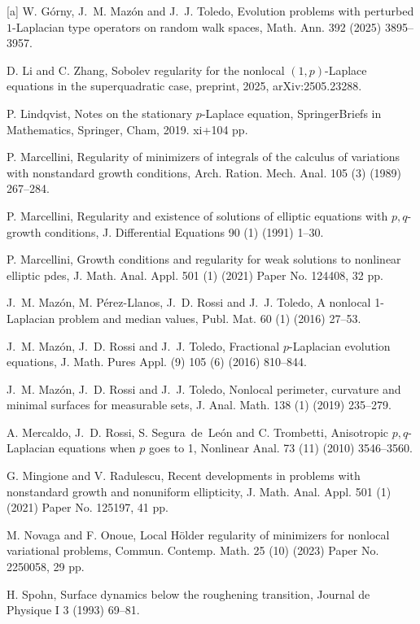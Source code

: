 \documentclass[reqno,10pt]{amsart}
\numberwithin{equation}{section}
\begin{document}
\begin{thebibliography}{[a]}
		 W. G\'{o}rny, J.~M. Maz\'on and J.~J. Toledo, Evolution problems with perturbed $1$-Laplacian type operators on random walk spaces, Math. Ann. 392 (2025) 3895--3957.

		
		 D. Li and C. Zhang, Sobolev regularity for the nonlocal $(1, p)$-Laplace equations in the superquadratic case, preprint, 2025, arXiv:2505.23288.
		
		 P. Lindqvist, Notes on the stationary {$p$}-Laplace equation, SpringerBriefs in Mathematics, Springer, Cham, 2019. xi+104 pp.
		
		 P. Marcellini, Regularity of minimizers of integrals of the calculus of variations with nonstandard growth conditions, Arch. Ration. Mech. Anal. 105 (3) (1989) 267--284.
		
		 P. Marcellini, Regularity and existence of solutions of elliptic equations with $p, q$-growth conditions, J. Differential Equations 90 (1) (1991) 1--30.
		
		 P. Marcellini, Growth conditions and regularity for weak solutions to nonlinear elliptic pdes, J. Math. Anal. Appl. 501 (1) (2021) Paper No. 124408, 32 pp.
		
		 J.~M. Maz\'on, M. P\'erez-Llanos, J.~D. Rossi and J.~J. Toledo, A nonlocal 1-Laplacian problem and median values, Publ. Mat. 60 (1) (2016) 27--53.
		
		 J.~M. Maz\'on, J.~D. Rossi and J.~J. Toledo, Fractional $p$-Laplacian evolution equations, J. Math. Pures Appl. (9) 105 (6) (2016) 810--844.
		
		 J.~M. Maz\'on, J.~D. Rossi and J.~J. Toledo, Nonlocal perimeter, curvature and minimal surfaces for measurable sets, J. Anal. Math. 138 (1) (2019) 235--279.
		
		 A. Mercaldo, J.~D. Rossi, S. Segura~de~Le\'on and C. Trombetti, Anisotropic $p, q$-Laplacian equations when $p$ goes to 1, Nonlinear Anal. 73 (11) (2010) 3546--3560.
		
		 G. Mingione and V. Radulescu, Recent developments in problems with nonstandard growth and nonuniform ellipticity, J. Math. Anal. Appl. 501 (1) (2021) Paper No. 125197, 41 pp.
		
		 M. Novaga and F. Onoue, Local H\"older regularity of minimizers for nonlocal variational problems, Commun. Contemp. Math. 25 (10) (2023) Paper No. 2250058, 29 pp.
		
		 H. Spohn, Surface dynamics below the roughening transition, Journal de Physique I 3 (1993) 69--81.
		

\end{thebibliography}
\end{document}
